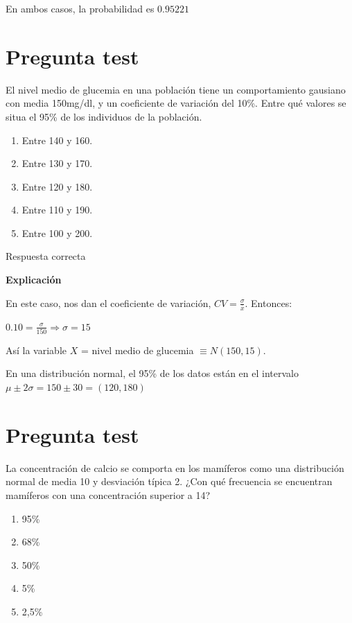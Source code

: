 \documentclass[
]{book}
\providecommand{\tightlist}{%
  \setlength{\itemsep}{0pt}\setlength{\parskip}{0pt}}
\begin{document}
En ambos casos, la probabilidad es \(0.95221\)

\hypertarget{pregunta-test-103}{%
\section{Pregunta test}\label{pregunta-test-103}}

El nivel medio de glucemia en una población tiene un comportamiento gausiano con media 150mg/dl, y un coeficiente de variación del 10\%. Entre qué valores se situa el 95\% de los individuos de la población.

\begin{enumerate}
\def\labelenumi{\alph{enumi})}
\tightlist
\item
  Entre 140 y 160.
\item
  Entre 130 y 170.
\item
  Entre 120 y 180.
\item
  Entre 110 y 190.
\item
  Entre 100 y 200.
\end{enumerate}

Respuesta correcta

\textbf{Explicación}

En este caso, nos dan el coeficiente de variación, \(CV=\frac{\sigma}{\overline{x}}\). Entonces:

\(0.10 = \frac{\sigma}{150} \Rightarrow \sigma = 15\)

Así la variable \(X\) = nivel medio de glucemia \(\equiv N(150, 15)\).

En una distribución normal, el 95\% de los datos están en el intervalo \(\mu \pm 2 \sigma= 150 \pm 30 = (120,180)\)

\hypertarget{pregunta-test-104}{%
\section{Pregunta test}\label{pregunta-test-104}}

La concentración de calcio se comporta en los mamíferos como una distribución normal de media 10 y desviación típica 2. ¿Con qué frecuencia se encuentran mamíferos con una concentración superior a 14?

\begin{enumerate}
\def\labelenumi{\alph{enumi})}
\tightlist
\item
  95\%
\item
  68\%
\item
  50\%
\item
  5\%
\item
  2,5\%
\end{enumerate}
\end{document}
